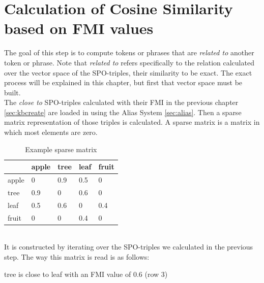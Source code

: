 \section{Calculation of Cosine Similarity based on FMI values}
\label{sec:kbcompute}
The goal of this step is to compute tokens or phrases that are \textit{related to} another token or phrase. Note that \textit{related to} refers specifically to the relation calculated over the vector space of the SPO-triples, their similarity to be exact. The exact process will be explained in this chapter, but first that vector space must be built.\\
The \textit{close to} SPO-triples calculated with their FMI in the previous chapter \ref{sec:kbcreate} are loaded in using the Alias System \ref{sec:alias}. Then a sparse matrix representation of those triples is calculated. A sparse matrix is a matrix in which most elements are zero.\\
\begin{table}[h!]
\centering
\caption{Example sparse matrix}
\label{table:sparse}
\begin{tabular}{l|l|l|l|l}
 & apple & tree & leaf & fruit\\ \hline
apple & 0 & 0.9 & 0.5 & 0 \\ \hline
tree & 0.9 & 0 & 0.6 & 0\\ \hline
leaf & 0.5 & 0.6 & 0 & 0.4 \\ \hline
fruit & 0 & 0 & 0.4 & 0\\ 
\end{tabular}
\end{table}\\

It is constructed by iterating over the SPO-triples we calculated in the previous step. The way this matrix is read is as follows:\\
\centerline{tree is close to leaf with an FMI value of 0.6 (row 3)}\\


